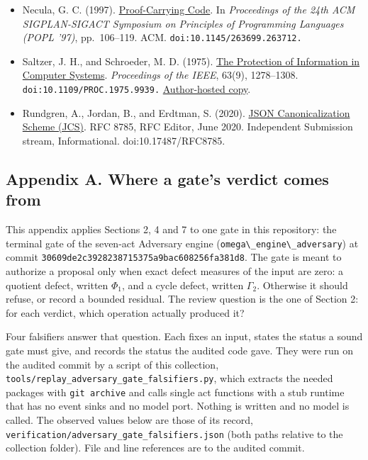 \documentclass[
  11pt,
]{article}
\newcommand{\passthrough}[1]{#1}
\providecommand{\tightlist}{%
  \setlength{\itemsep}{0pt}\setlength{\parskip}{0pt}}
\begin{document}
\begin{itemize}
\tightlist
\item
  Necula, G. C. (1997).
  \href{https://doi.org/10.1145/263699.263712}{Proof-Carrying Code}. In
  \emph{Proceedings of the 24th ACM SIGPLAN-SIGACT Symposium on
  Principles of Programming Languages (POPL '97)}, pp.~106--119. ACM.
  \nolinkurl{doi:10.1145/263699.263712.}
\item
  Saltzer, J. H., and Schroeder, M. D. (1975).
  \href{https://doi.org/10.1109/PROC.1975.9939}{The Protection of
  Information in Computer Systems}. \emph{Proceedings of the IEEE},
  63(9), 1278--1308. \nolinkurl{doi:10.1109/PROC.1975.9939.}
  \href{https://web.mit.edu/Saltzer/www/publications/protection/}{Author-hosted
  copy}.
\item
  Rundgren, A., Jordan, B., and Erdtman, S. (2020).
  \href{https://www.rfc-editor.org/rfc/rfc8785}{JSON Canonicalization
  Scheme (JCS)}. RFC 8785, RFC Editor, June 2020. Independent Submission
  stream, Informational. doi:10.17487/RFC8785.
\end{itemize}

\subsection{Appendix A. Where a gate's verdict comes
from}\label{appendix-a.-where-a-gates-verdict-comes-from}

This appendix applies Sections 2, 4 and 7 to one gate in this
repository: the terminal gate of the seven-act Adversary engine
(\passthrough{\lstinline!omega\_engine\_adversary!}) at commit
\nolinkurl{30609de2c3928238715375a9bac608256fa381d8}. The gate is meant
to authorize a proposal only when exact defect measures of the input are
zero: a quotient defect, written \(\Phi_1\), and a cycle defect, written
\(\Gamma_2\). Otherwise it should refuse, or record a bounded residual.
The review question is the one of Section 2: for each verdict, which
operation actually produced it?

Four falsifiers answer that question. Each fixes an input, states the
status a sound gate must give, and records the status the audited code
gave. They were run on the audited commit by a script of this
collection, \nolinkurl{tools/replay_adversary_gate_falsifiers.py}, which
extracts the needed packages with \passthrough{\lstinline!git archive!}
and calls single act functions with a stub runtime that has no event
sinks and no model port. Nothing is written and no model is called. The
observed values below are those of its record,
\nolinkurl{verification/adversary_gate_falsifiers.json} (both paths
relative to the collection folder). File and line references are to the
audited commit.
\end{document}
